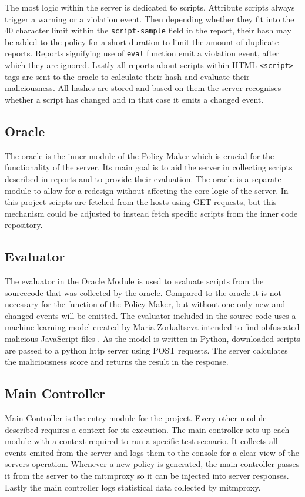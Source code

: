 The most logic within the server is dedicated to scripts.
Attribute scripts always trigger a warning or a violation event.
Then depending whether they fit into the 40 character limit within the \texttt{script-sample} field in the report, their hash may be added to the policy for a short duration to limit the amount of duplicate reports.
Reports signifying use of \texttt{eval} function emit a violation event, after which they are ignored.
Lastly all reports about scripts within HTML \texttt{<script>} tags are sent to the oracle to calculate their hash and evaluate their maliciousness.
All hashes are stored and based on them the server recognises whether a script has changed and in that case it emits a changed event.

\subsection{Oracle}
The oracle is the inner module of the Policy Maker which is crucial for the functionality of the server.
Its main goal is to aid the server in collecting scripts described in reports and to provide their evaluation.
The oracle is a separate module to allow for a redesign without affecting the core logic of the server.
In this project scirpts are fetched from the hosts using GET requests, but this mechanism could be adjusted to instead fetch specific scripts from the inner code repository.

\subsection{Evaluator}
The evaluator in the Oracle Module is used to evaluate scripts from the sourcecode that was collected by the oracle.
Compared to the oracle it is not necessary for the function of the Policy Maker, but without one only new and changed events will be emitted.
The evaluator included in the source code uses a machine learning model created by Maria Zorkaltseva intended to find obfuscated malicious JavaScript files \cite{evaluator}.
As the model is written in Python, downloaded scripts are passed to a python http server using POST requests.
The server calculates the maliciousness score and returns the result in the response.

\subsection{Main Controller}
Main Controller is the entry module for the project.
Every other module described requires a context for its execution.
The main controller sets up each module with a context required to run a specific test scenario.
It collects all events emited from the server and logs them to the console for a clear view of the servers operation.
Whenever a new policy is generated, the main controller passes it from the server to the mitmproxy so it can be injected into server responses.
Lastly the main controller logs statistical data collected by mitmproxy.


